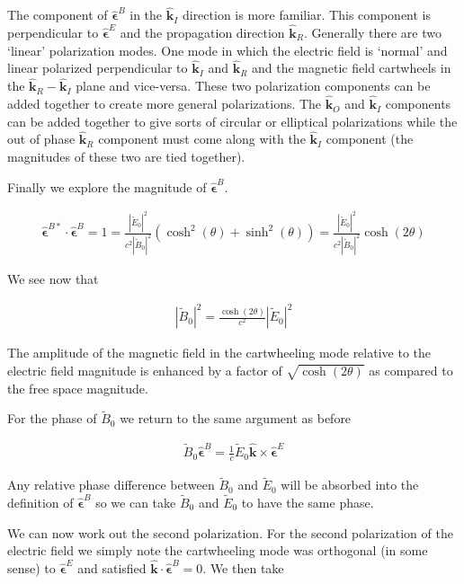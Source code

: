 \documentclass[12pt]{article}
\newcommand{\ep}{\epsilon}
\newcommand{\unitvec}[1]{\hat{\boldsymbol{#1}}}
\begin{document}
The component of $\unitvec{\ep}^B$ in the $\unitvec{k}_I$ direction is more familiar.
This component is perpendicular to $\unitvec{\ep}^E$ and the propagation direction $\unitvec{k}_R$.
Generally there are two `linear' polarization modes. 
One mode in which the electric field is `normal' and linear polarized perpendicular to $\unitvec{k}_I$ and $\unitvec{k}_R$ and the magnetic field cartwheels in the $\unitvec{k}_R-\unitvec{k}_I$ plane and vice-versa.
These two polarization components can be added together to create more general polarizations. 
The $\unitvec{k}_O$ and $\unitvec{k}_I$ components can be added together to give sorts of circular or elliptical polarizations while the out of phase $\unitvec{k}_R$ component must come along with the $\unitvec{k}_I$ component (the magnitudes of these two are tied together).

Finally we explore the magnitude of $\unitvec{\ep}^B$.

\begin{align}
\unitvec{\ep}^{B*} \cdot\unitvec{\ep}^B = 1 = \frac{|\tilde{E}_0|^2}{c^2 |\tilde{B}_0|^2} \left(\cosh^2(\theta) + \sinh^2(\theta)\right) = \frac{|\tilde{E}_0|^2}{c^2 |\tilde{B}_0|^2} \cosh(2\theta)
\end{align}

We see now that

\begin{align}
|\tilde{B}_0|^2 = \frac{\cosh(2\theta)}{c^2} |\tilde{E}_0|^2
\end{align}

The amplitude of the magnetic field in the cartwheeling mode relative to the electric field magnitude is enhanced by a factor of $\sqrt{\cosh(2\theta)}$ as compared to the free space magnitude.

For the phase of $\tilde{B}_0$ we return to the same argument as before

\begin{align}
\tilde{B}_0 \unitvec{\ep}^B = \frac{1}{c}\tilde{E}_0 \unitvec{k}\times \unitvec{\ep}^E
\end{align}

Any relative phase difference between $\tilde{B}_0$ and $\tilde{E}_0$ will be absorbed into the definition of $\unitvec{\ep}^B$ so we can take $\tilde{B}_0$ and $\tilde{E}_0$ to have the same phase.

We can now work out the second polarization.
For the second polarization of the electric field we simply note the cartwheeling mode was orthogonal (in some sense) to $\unitvec{\ep}^E$ and satisfied $\unitvec{k}\cdot \unitvec{\ep}^B = 0$. 
We then take
\end{document}
